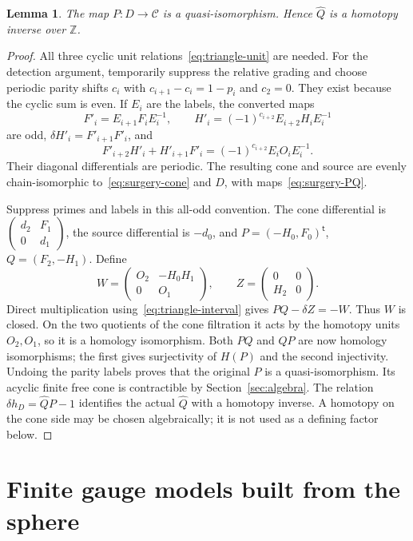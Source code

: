 \documentclass[11pt]{amsart}
\newtheorem{lemma}[theorem]{Lemma}
\theoremstyle{definition}
\theoremstyle{remark}
\theoremstyle{plain}
\newcommand{\ZZ}{\mathbb Z}
\begin{document}
\begin{lemma}\label{lem:triangle-detection}
The map $P:D\to\mathcal C$ is a quasi-isomorphism. Hence
$\widehat Q$ is a homotopy inverse over $\ZZ$.
\end{lemma}
\begin{proof}
All three cyclic unit relations~\eqref{eq:triangle-unit} are
needed. For the detection argument, temporarily suppress the
relative grading and choose periodic parity shifts $c_i$ with
$c_{i+1}-c_i=1-p_i$ and $c_2=0$. They exist because the cyclic
sum is even. If $E_i$ are the labels, the converted maps
\[
 F'_i=E_{i+1}F_iE_i^{-1},\qquad
 H'_i=(-1)^{c_{i+2}}E_{i+2}H_iE_i^{-1}
\]
are odd, $\delta H'_i=F'_{i+1}F'_i$, and
\[
 F'_{i+2}H'_i+H'_{i+1}F'_i
   =(-1)^{c_{i+2}}E_iO_iE_i^{-1}.
\]
Their diagonal differentials are periodic. The resulting cone
and source are evenly chain-isomorphic to~\eqref{eq:surgery-cone}
and $D$, with maps~\eqref{eq:surgery-PQ}.

Suppress primes and labels in this all-odd convention. The cone
differential is $\left(\begin{smallmatrix}d_2&F_1\\0&d_1\end{smallmatrix}\right)$,
the source differential is $-d_0$, and
$P=(-H_0,F_0)^{\mathsf t}$, $Q=(F_2,-H_1)$. Define
\[
 W=\begin{pmatrix}O_2&-H_0H_1\\0&O_1\end{pmatrix},\qquad
 Z=\begin{pmatrix}0&0\\H_2&0\end{pmatrix}.
\]
Direct multiplication using~\eqref{eq:triangle-interval} gives
$PQ-\delta Z=-W$. Thus $W$ is closed. On the two quotients
of the cone filtration it acts by the homotopy units $O_2,O_1$,
so it is a homology isomorphism. Both $PQ$ and $QP$ are now
homology isomorphisms; the first gives surjectivity of $H(P)$
and the second injectivity. Undoing the parity labels proves
that the original $P$ is a quasi-isomorphism. Its acyclic finite
free cone is contractible by Section~\ref{sec:algebra}.
The relation $\delta h_D=\widehat QP-1$ identifies the actual
$\widehat Q$ with a homotopy inverse. A homotopy on the cone
side may be chosen algebraically; it is not used as a defining
factor below.
\end{proof}

\section{Finite gauge models built from the sphere}\label{sec:models}
\end{document}

